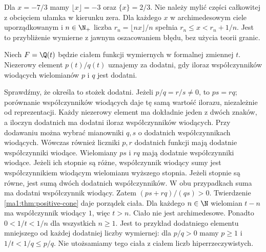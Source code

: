 \begin{przyklad}
Dla $x=-7/3$ mamy $\lfloor x\rfloor=-3$ oraz $\{x\}=2/3$. Nie należy mylić części całkowitej z obcięciem ułamka w kierunku zera.
Dla każdego $x$ w archimedesowym ciele uporządkowanym i $n\in\N_+$ liczba $r_n=\lfloor nx\rfloor/n$ spełnia $r_n\le x<r_n+1/n$. Jest to przybliżenie wymierne z jawnym oszacowaniem błędu, bez użycia teorii granic.
\end{przyklad}
\begin{przyklad}
\label{ma1:ex:nonarchimedean}
Niech $F=\Q(t)$ będzie ciałem funkcji wymiernych w formalnej zmiennej $t$. Niezerowy element $p(t)/q(t)$ uznajemy za dodatni, gdy iloraz współczynników wiodących wielomianów $p$ i $q$ jest dodatni.
\end{przyklad}
Sprawdźmy, że określa to stożek dodatni. Jeżeli $p/q=r/s\ne0$, to $ps=rq$; porównanie współczynników wiodących daje tę samą wartość ilorazu, niezależnie od reprezentacji. Każdy niezerowy element ma dokładnie jeden z dwóch znaków, a iloczyn dodatnich ma dodatni iloraz współczynników wiodących. Przy dodawaniu można wybrać mianowniki $q,s$ o dodatnich współczynnikach wiodących. Wówczas również liczniki $p,r$ dodatnich funkcji mają dodatnie współczynniki wiodące. Wielomiany $ps$ i $rq$ mają dodatnie współczynniki wiodące. Jeżeli ich stopnie są różne, współczynnik wiodący sumy jest współczynnikiem wiodącym wielomianu wyższego stopnia. Jeżeli stopnie są równe, jest sumą dwóch dodatnich współczynników. W obu przypadkach suma ma dodatni współczynnik wiodący. Zatem $(ps+rq)/(qs)>0$. Twierdzenie \ref{ma1:thm:positive-cone} daje porządek ciała.
Dla każdego $n\in\N$ wielomian $t-n$ ma współczynnik wiodący $1$, więc $t>n$. Ciało nie jest archimedesowe. Ponadto $0<1/t<1/n$ dla wszystkich $n\ge1$. Jest to przykład dodatniego elementu mniejszego od każdej dodatniej liczby wymiernej: dla $p/q>0$ mamy $p\ge1$ i $1/t<1/q\le p/q$. Nie utożsamiamy tego ciała z ciałem liczb hiperrzeczywistych.

